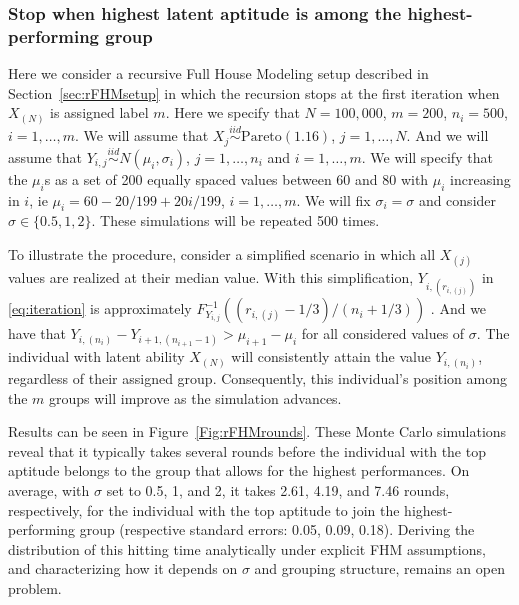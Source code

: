 \documentclass[12pt]{article}
\begin{document}
\subsubsection{Stop when highest latent aptitude is among the highest-performing group}
\label{sec:rFHMbestgroup}

Here we consider a recursive Full House Modeling setup described in Section~\ref{sec:rFHMsetup} in which the recursion stops at the first iteration when $X_{(N)}$ is assigned label $m$. Here we specify that $N = 100,000$, $m=200$, $n_i = 500$, $i = 1,\ldots,m$. We will assume that $X_j \overset{iid}{\sim} \text{Pareto}(1.16)$, $j = 1,\ldots,N$. And we will assume that $Y_{i,j} \overset{iid}{\sim} N(\mu_i,\sigma_i)$, $j = 1,\ldots,n_i$ and $i = 1,\ldots,m$. We will specify that the $\mu_i$s as a set of 200 equally spaced values between 60 and 80 with $\mu_i$ increasing in $i$, ie $\mu_i = 60 - 20/199 + 20i/199$, $i=1,\ldots,m$. %
We will fix $\sigma_i = \sigma$ and consider $\sigma \in \{0.5,1,2\}$. These simulations will be repeated 500 times.

To illustrate the procedure, consider a simplified scenario in which all $X_{(j)}$ values are realized at their median value. With this simplification, $Y_{i,(r_{i,(j)})}$ in \eqref{eq:iteration} is approximately $F_{Y_{i,j}}^{-1}( (r_{i,(j)} - 1/3)/(n_i + 1/3))$ \citep{kerman2011closed}. And we have that $Y_{i,(n_{i})} - Y_{i+1,(n_{i+1}-1)} > \mu_{i+1} - \mu_{i}$ for all considered values of $\sigma$. The individual with latent ability $X_{(N)}$ will consistently attain the value $Y_{i,(n_{i})}$, regardless of their assigned group. Consequently, this individual's position among the $m$ groups will improve as the simulation advances. 

Results can be seen in Figure~\ref{Fig:rFHMrounds}. These Monte Carlo simulations reveal that it typically takes several rounds before the individual with the top aptitude belongs to the group that allows for the highest performances. On average, with $\sigma$ set to 0.5, 1, and 2, it takes 2.61, 4.19, and 7.46 rounds, respectively, for the individual with the top aptitude to join the highest-performing group (respective standard errors: 0.05, 0.09, 0.18). Deriving the distribution of this hitting time analytically under explicit FHM assumptions, and characterizing how it depends on $\sigma$ and grouping structure, remains an open problem. 
\end{document}
